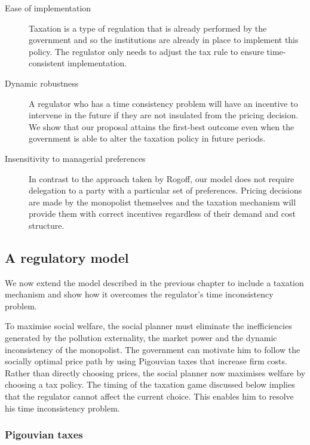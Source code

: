 \begin{description}
\item[Ease of implementation] Taxation is a type of regulation that is
already performed by the government and so the institutions are already in
place to implement this policy. The regulator only needs to adjust the tax
rule to ensure time-consistent implementation.

\item[Dynamic robustness] A regulator who has a time consistency problem
will have an incentive to intervene in the future if they are not insulated
from the pricing decision. We show that our proposal attains the first-best
outcome even when the government is able to alter the taxation policy in
future periods.

\item[Insensitivity to managerial preferences] In contrast to the approach
taken by Rogoff, our model does not require delegation to a party with a
particular set of preferences. Pricing decisions are made by the monopolist
themselves and the taxation mechanism will provide them with correct
incentives regardless of their demand and cost structure.
\end{description}

\subsection{A regulatory model}

\label{sec:regulatory-model}

We now extend the model described in the previous chapter to include a
taxation mechanism and show how it overcomes the regulator's time
inconsistency problem.

To maximise social welfare, the social planner must eliminate the
inefficiencies generated by the pollution externality, the market power and
the dynamic inconsistency of the monopolist. The government can motivate him
to follow the socially optimal price path by using Pigouvian taxes that
increase firm costs. Rather than directly choosing prices, the social
planner now maximises welfare by choosing a tax policy. The timing of the
taxation game discussed below implies that the regulator cannot affect the
current choice. This enables him to resolve his time inconsistency problem.

\subsubsection{Pigouvian taxes}

